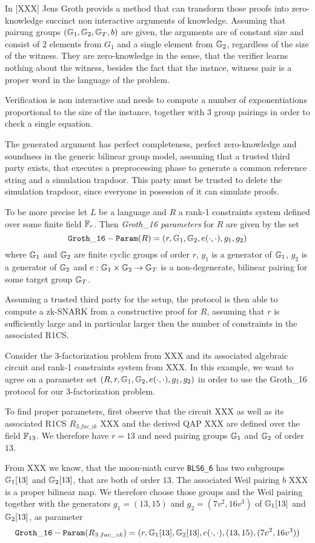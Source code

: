 In [XXX] Jens Groth provids a method that can transform those proofs into zero-knowledge succinct non interactive arguments of knowledge. Assuming that pairung groups $(\mathbb{G}_1,\mathbb{G}_2,\mathbb{G}_T,b)$ are given, the arguments are of constant size and consist of $2$ elements from $G_1$ and a single element from $\mathbb{G}_2$, regardless of the size of the witness. They are zero-knowledge in the sense, that the verifier learns nothing about the witness, besides the fact that the instnce, witness pair is a proper word in the language of the problem.

Verification is non interactive and needs to compute a number of exponentiations proportional to the size of the instance, together with $3$ group pairings in order to check a single equation.

The generated argument has perfect completeness, perfect zero-knowledge and soundness in the generic bilinear group model, assuming that a trusted third party exists, that executes a preprocessing phase to generate a common reference string and a simulation trapdoor. This party must be trusted to delete the simulation trapdoor, since everyone in posession of it can simulate proofs. 

To be more precise let $L$ be a language and $R$ a rank-1 constraints system defined over some finite field $\mathbb{F}_r$. Then \textit{Groth\_16 parameters} for $R$ are given by the set
\begin{equation}
\mathtt{Groth\_16-Param}(R)=(r, \mathbb{G}_1, \mathbb{G}_2, e(\cdot,\cdot), g_1,g_2)
\end{equation}
where $\mathbb{G}_1$ and $\mathbb{G}_2$ are finite cyclic groups of order $r$, $g_1$ is a generator of $\mathbb{G}_1$, $g_2$ is a generator of $\mathbb{G}_2$ and $e: \mathbb{G}_1 \times \mathbb{G}_2 \to \mathbb{G}_T$ is a non-degenerate, bilinear pairing for some target group $\mathbb{G}_T$. 

Assuming a trusted third party for the setup, the protocol is then able to compute a zk-SNARK from a constructive proof for $R$, assuming that $r$ is sufficiently large and in particular larger then the number of constraints in the associated R1CS.
\begin{example} Consider the $3$-factorization problem from XXX and its associated algebraic circuit and rank-1 constraints system from  XXX. In this example, we want to agree on a parameter set $(R,r, \mathbb{G}_1, \mathbb{G}_2, e(\cdot,\cdot), g_1,g_2)$ in order to use the Groth\_16 protocol for our $3$-factorization problem. 

To find proper parameters, first observe that the circuit XXX as well as its associated R1CS $R_{3.fac\_zk}$ XXX and the derived QAP XXX are defined over the field $\mathbb{F}_{13}$. We therefore have $r=13$ and need pairing groups $\mathbb{G}_1$ and $\mathbb{G}_2$ of order $13$. 

From XXX we know, that the moon-math curve \texttt{BLS6\_6} has two subgroups $\mathbb{G}_1[13]$ and $\mathbb{G}_2[13]$, that are both of order $13$. The associated Weil pairing $b$ XXX is a proper bilinear map. We therefore choose those groups and the Weil pairing together with the generators $g_1 = (13,15) $ and $g_2=(7v^2,16v^3)$ of $\mathbb{G}_1[13]$ and $\mathbb{G}_2[13]$, as parameter
$$
\mathtt{Groth\_16-Param}(R_{3.fac\_zk})=(r, \mathbb{G}_1[13], \mathbb{G}_2[13], e(\cdot,\cdot), (13,15),(7v^2,16v^3))
$$
\end{example}
